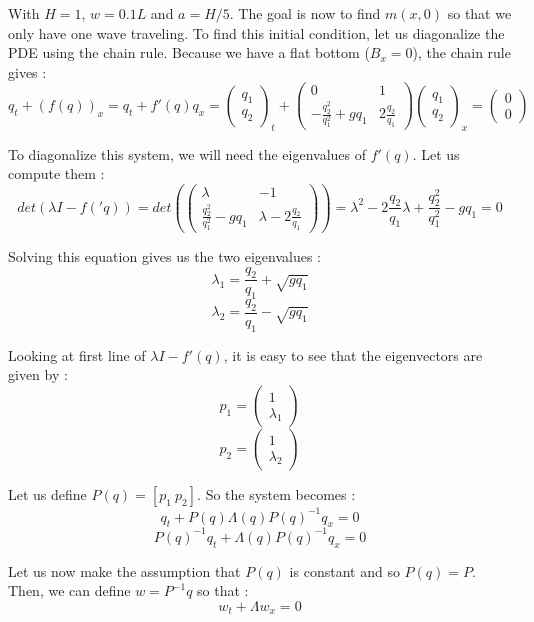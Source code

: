 With $H =1$, $w=0.1L$ and $a=H/5$. The goal is now to find $m(x,0)$ so that we only have one wave traveling. To find this initial condition, let us diagonalize the PDE using the chain rule. Because we have a flat bottom ($B_x=0$), the chain rule gives :
$$q_t+(f(q))_x = q_t + f'(q)q_x = \left(\begin{array}{c}
q_1 \\ 
q_2
\end{array}\right)_t + 
\left(\begin{array}{cc}
0 & 1 \\ 
-\frac{q_2^2}{q_1^2}+gq_1 & 2 \frac{q_2}{q_1}
\end{array}\right)\left(\begin{array}{c}
q_1 \\ 
q_2
\end{array}\right)_x = \left(\begin{array}{c}
0 \\ 
0
\end{array}\right)  $$ 

To diagonalize this system, we will need the eigenvalues of $f'(q)$. Let us compute them :
$$det(\lambda I - f('q))= det(\left(\begin{array}{cc}
\lambda & -1 \\ 
\frac{q_2^2}{q_1^2}-gq_1 & \lambda - 2 \frac{q_2}{q_1}
\end{array}\right)) = \lambda^2 - 2\frac{q_2}{q_1}\lambda + \frac{q_2^2}{q_1^2}-gq_1 = 0$$

Solving this equation gives us the two eigenvalues : 
$$\lambda_1 = \frac{q_2}{q_1} + \sqrt{gq_1}$$
$$\lambda_2 = \frac{q_2}{q_1} - \sqrt{gq_1}$$

Looking at first line of $\lambda I -f'(q)$, it is easy to see that the eigenvectors are given by : 
$$p_1 = \left(\begin{array}{c}
1 \\ 
\lambda_1
\end{array}\right)$$
$$p_2 = \left(\begin{array}{c}
1 \\ 
\lambda_2
\end{array}\right)$$

Let us define $P(q) = [p_1\: p_2]$. So the system becomes :
$$q_t + P(q)\Lambda(q) P(q)^{-1} q_x = 0$$
$$P(q)^{-1}q_t + \Lambda(q) P(q)^{-1} q_x = 0$$

Let us now make the assumption that $P(q)$ is constant and so $P(q)=P$. Then, we can define $w=P^{-1}q$ so that :
$$w_t + \Lambda w_x = 0$$

